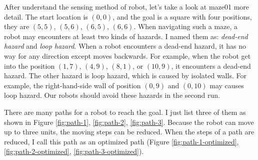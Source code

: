 \documentclass[11pt, oneside]{article}   	%
\begin{document}
After understand the sensing method of robot, let’s take a look at maze01 more detail. The start location is $(0,0)$, and the goal is a square with four positions, they are $(5,5)$, $(5,6)$, $(6,5)$, $(6,6)$. When navigating such a maze, a robot may encounters at least two kinds of hazards. I named them as: {\it dead-end hazard} and {\it loop hazard}. When a robot encounters a dead-end hazard, it has no way for any direction except moves backwards. For example, when the robot get into the position $(1,7)$, $(4,9)$, $(8,1)$, or $(10,9)$, it encounters a dead-end hazard. The other hazard is loop hazard, which is caused by isolated walls. For example, the right-hand-side wall of position $(0,9)$ and $(0,10)$ may causes loop hazard. Our robots should avoid these hazards in the second run.

There are many paths for a robot to reach the goal. I just list three of them as shown in Figure \ref{fig:path-1}, \ref{fig:path-2}, \ref{fig:path-3}. Because the robot can move up to three units, the moving steps can be reduced. When the steps of a path are reduced, I call this path as an optimized path (Figure \ref{fig:path-1-optimized}, \ref{fig:path-2-optimized}, \ref{fig:path-3-optimized}).
\end{document}
